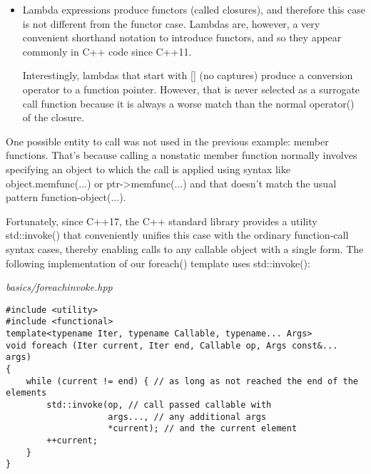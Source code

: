 \begin{itemize}
would be transformed into

\begin{lstlisting}[style=styleCXX]
(op.operator F())(*current);
\end{lstlisting}

where F is the type of the pointer-to-function or reference-to-function that the class type object can be converted to. This is relatively unusual.

\item 
Lambda expressions produce functors (called closures), and therefore this case is not different from the functor case. Lambdas are, however, a very convenient shorthand notation to introduce functors, and so they appear commonly in C++ code since C++11.

Interestingly, lambdas that start with [] (no captures) produce a conversion operator to a function pointer. However, that is never selected as a surrogate call function because it is always a worse match than the normal operator() of the closure.
\end{itemize}


One possible entity to call was not used in the previous example: member functions. That’s because calling a nonstatic member function normally involves specifying an object to which the call is applied using syntax like object.memfunc(...) or ptr->memfunc(...) and that doesn’t match the usual pattern function-object(...).

Fortunately, since C++17, the C++ standard library provides a utility std::invoke() that conveniently unifies this case with the ordinary function-call syntax cases, thereby enabling calls to any callable object with a single form. The following implementation of our foreach() template uses std::invoke():

\noindent
\textit{basics/foreachinvoke.hpp}
\begin{lstlisting}[style=styleCXX]
#include <utility>
#include <functional>
template<typename Iter, typename Callable, typename... Args>
void foreach (Iter current, Iter end, Callable op, Args const&... args)
{
	while (current != end) { // as long as not reached the end of the elements
		std::invoke(op, // call passed callable with
					args..., // any additional args
					*current); // and the current element
		++current;
	}
}
\end{lstlisting}


